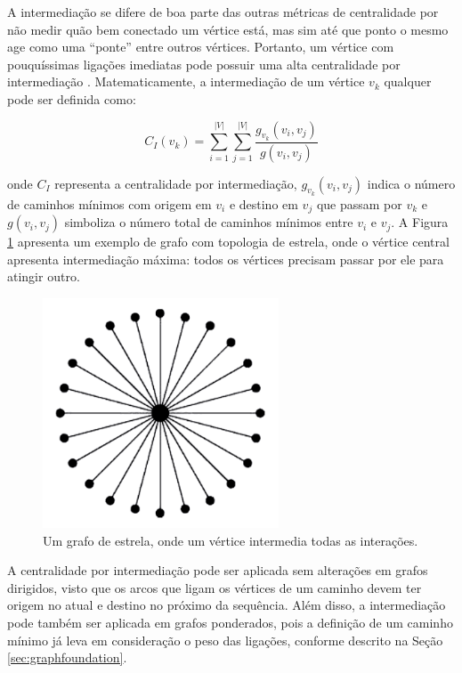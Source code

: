A intermediação se difere de boa parte das outras métricas de centralidade por não medir quão bem conectado um vértice está, mas sim até que ponto o mesmo age como uma ``ponte'' entre outros vértices. Portanto, um vértice com pouquíssimas ligações imediatas pode possuir uma alta centralidade por intermediação \cite{Newman2010}. Matematicamente, a intermediação de um vértice $v_k$ qualquer pode ser definida como:

\begin{equation}
    \label{eq:betweenness}
    C_I(v_k) = \sum_{i=1}^{|V|} \sum_{j=1}^{|V|} \frac{g_{v_k}(v_i, v_j)}{g(v_i, v_j)}
\end{equation}

\noindent onde $C_I$ representa a centralidade por intermediação, $g_{v_k}(v_i, v_j)$ indica o número de caminhos mínimos com origem em $v_i$ e destino em $v_j$ que passam por $v_k$ e $g(v_i, v_j)$ simboliza o número total de caminhos mínimos entre $v_i$ e $v_j$. A Figura \ref{fig:star} apresenta um exemplo de grafo com topologia de estrela, onde o vértice central apresenta intermediação máxima: todos os vértices precisam passar por ele para atingir outro.

\begin{figure}[ht]
    \centering
    \includegraphics[width=7cm]{imagens/star.png}
    \caption{Um grafo de estrela, onde um vértice intermedia todas as interações.}
    \label{fig:star}
\end{figure}

A centralidade por intermediação pode ser aplicada sem alterações em grafos dirigidos, visto que os arcos que ligam os vértices de um caminho devem ter origem no atual e destino no próximo da sequência. Além disso, a intermediação pode também ser aplicada em grafos ponderados, pois a definição de um caminho mínimo já leva em consideração o peso das ligações, conforme descrito na Seção \ref{sec:graphfoundation}.

